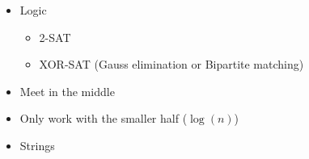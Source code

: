 \documentclass[8pt,a4paper,landscape,oneside]{amsart}
\newenvironment{myitemize}
{ \begin{itemize}[leftmargin=.5cm]
    \setlength{\itemsep}{0pt}
    \setlength{\parskip}{0pt}
    \setlength{\parsep}{0pt}     }
{ \end{itemize}                  }
\begin{document}
\begin{multicols*}{3}
\begin{myitemize}
\begin{itemize}
\begin{itemize}
                                \item Sum of convex (concave) functions is convex (concave)
                            \end{itemize}
                        \item Modular arithmetic
                            \begin{itemize}
                                \item Chinese Remainder Theorem
                                \item Linear Congruence
                            \end{itemize}
                        \item Sieve
                        \item System of linear equations
                        \item Values too big to represent?
                            \begin{itemize}
                                \item Compute using the logarithm
                                \item Divide everything by some large value
                            \end{itemize}
                        \item Linear programming
                            \begin{itemize}
                                \item Is the dual problem easier to solve?
                            \end{itemize}
                        \item Can the problem be modeled as a different combinatorial problem? Does that simplify calculations?
                    \end{itemize}
                \item Logic
                    \begin{itemize}
                        \item 2-SAT
                        \item XOR-SAT (Gauss elimination or Bipartite matching)
                    \end{itemize}
                \item Meet in the middle
                \item Only work with the smaller half ($\log(n)$)
                \item Strings

\end{myitemize}
\end{multicols*}
\end{document}
